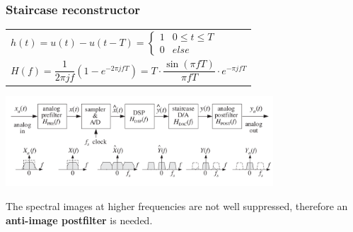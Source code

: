 \subsubsection{Staircase reconstructor }
  \begin{tabular}{p{8.2cm}}
    $h(t) = u(t) - u(t-T) = \left\lbrace \begin{matrix}
      1 & 0\leq t \leq T \\
      0 & else
    \end{matrix}\right.$ \\
    $H(f) = \dfrac{1}{2\pi j f}(1-e^{-2\pi j f T}) = T \cdot \dfrac{\sin(\pi f T)}{\pi f T}\cdot e^{-\pi j f T}$
  \end{tabular}
  \begin{minipage}{10cm}
	    \includegraphics[width=10cm]{./picture/compOfDSPSystem}
  \end{minipage}
  
  The spectral images at higher frequencies are not well suppressed, therefore an \textbf{anti-image postfilter} is needed.\\

  

  
  
